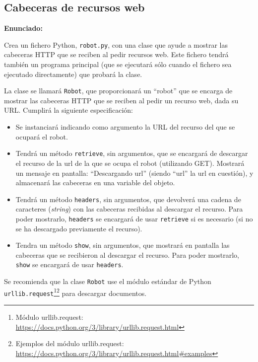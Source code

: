 \subsection{Cabeceras de recursos web}
\label{subsec:eje-python-cabreceras}

\textbf{Enunciado:}

Crea un fichero Python, \verb|robot.py|, con una clase que ayude a mostrar las cabeceras HTTP que se reciben al pedir recursos web. Este fichero tendrá también un programa principal (que se ejecutará sólo cuando el fichero sea ejecutado directamente) que probará la clase.

La clase se llamará \verb|Robot|, que proporcionará un ``robot'' que se encarga de mostrar las cabeceras HTTP que se reciben al pedir un recurso web, dada su URL. Cumplirá la siguiente especificación:
  \begin{itemize}
  \item Se instanciará indicando como argumento la URL del recurso del que se ocupará el robot.
  \item Tendrá un método \verb|retrieve|, sin argumentos, que se encargará de descargar el recurso de la url de la que se ocupa el robot (utilizando GET). Mostrará un mensaje en pantalla: ``Descargando url'' (siendo ``url'' la url en cuestión), y almacenará las cabeceras en una variable del objeto.
  \item Tendrá un método \verb|headers|, sin argumentos, que devolverá una cadena de caracteres (\emph{string}) con las cabeceras recibidas al descargar el recurso. Para poder mostrarlo, \verb|headers| se encargará de usar \verb|retrieve| si es necesario (si no se ha descargado previamente el recurso).
  \item Tendra un método \verb|show|, sin argumentos, que mostrará en pantalla las cabeceras que se recibieron al descargar el recurso. Para poder mostrarlo, \verb|show| se encargará de usar \verb|headers|.
  \end{itemize}

Se recomienda que la clase \verb|Robot| use el módulo estándar de Python \verb|urllib.request|\footnote{Módulo urllib.request: \\ \url{https://docs.python.org/3/library/urllib.request.html}}\footnote{Ejemplos del módulo urllib.request: \\ \url{https://docs.python.org/3/library/urllib.request.html\#examples}} para descargar documentos.

